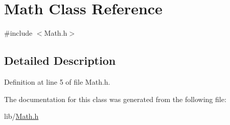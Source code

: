 \hypertarget{class_math}{}\section{Math Class Reference}
\label{class_math}


{\ttfamily \#include $<$Math.\+h$>$}



\subsection{Detailed Description}


Definition at line 5 of file Math.\+h.



The documentation for this class was generated from the following file\+:\begin{DoxyCompactItemize}
\item 
lib/\hyperlink{_math_8h}{Math.\+h}\end{DoxyCompactItemize}

